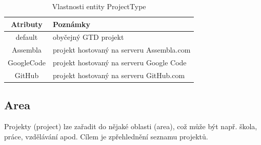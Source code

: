 \begin{table}[h]
\begin{center}
	\begin{tabular}{|c|l|}
	\hline
	Atributy & Poznámky \\
	\hline
	default & obyčejný GTD projekt \\
	Assembla & projekt hostovaný na serveru Assembla.com \\
	GoogleCode & projekt hostovaný na serveru Google Code \\
	GitHub & projekt hostovaný na serveru GitHub.com \\
	\hline
	\end{tabular}
\end{center}
\caption{Vlastnosti entity ProjectType}
\label{tab:projectType}
\end{table}

\subsection{Area}

Projekty (project) lze zařadit do nějaké oblasti (area), což může být např. škola, práce, vzdělávání apod. Cílem je zpřehlednění seznamu projektů.